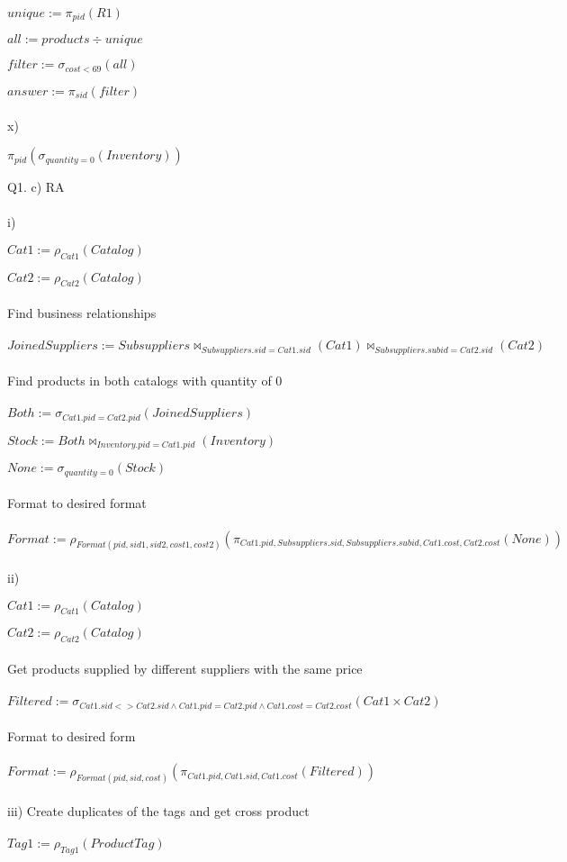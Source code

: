 \documentclass[11pt]{article}
\begin{document}
$unique := \pi_{pid}(R1)$

$all := products \div unique$

$filter := \sigma_{cost<69}(all)$

$answer := \pi_{sid}(filter)$
\\~\\
x)

$\pi_{pid}(\sigma_{quantity=0}(Inventory))$

\break

Q1. c) RA
\\~\\
i)

$Cat1 := \rho_{Cat1}(Catalog)$

$Cat2 := \rho_{Cat2}(Catalog)$
\\~\\
Find business relationships
\\~\\
$JoinedSuppliers := Subsuppliers \bowtie_{Subsuppliers.sid = Cat1.sid}(Cat1) \bowtie_{Subsuppliers.subid = Cat2.sid}(Cat2)$
\\~\\
Find products in both catalogs with quantity of 0
\\~\\
$Both := \sigma_{Cat1.pid = Cat2.pid}(JoinedSuppliers)$

$Stock := Both \bowtie_{Inventory.pid =  Cat1.pid}(Inventory)$

$None := \sigma_{quantity = 0}(Stock)$
\\~\\
Format to desired format
\\~\\
$Format := \rho_{Format(pid, sid1, sid2, cost1, cost2)}(\pi_{Cat1.pid, Subsuppliers.sid, Subsuppliers.subid, Cat1.cost, Cat2.cost}(None))$
\\~\\
ii)

$Cat1 := \rho_{Cat1}(Catalog)$

$Cat2 := \rho_{Cat2}(Catalog)$
\\~\\
Get products supplied by different suppliers with the same price
\\~\\
$Filtered := \sigma_{Cat1.sid <> Cat2.sid \wedge Cat1.pid = Cat2.pid \wedge Cat1.cost = Cat2.cost}(Cat1 \times Cat2)$
\\~\\
Format to desired form
\\~\\
$Format := \rho_{Format(pid, sid, cost)}(\pi_{Cat1.pid, Cat1.sid, Cat1.cost}(Filtered))$
\\~\\
iii)
Create duplicates of the tags and get cross product
\\~\\
$Tag1 := \rho_{Tag1}(ProductTag)$
\end{document}
